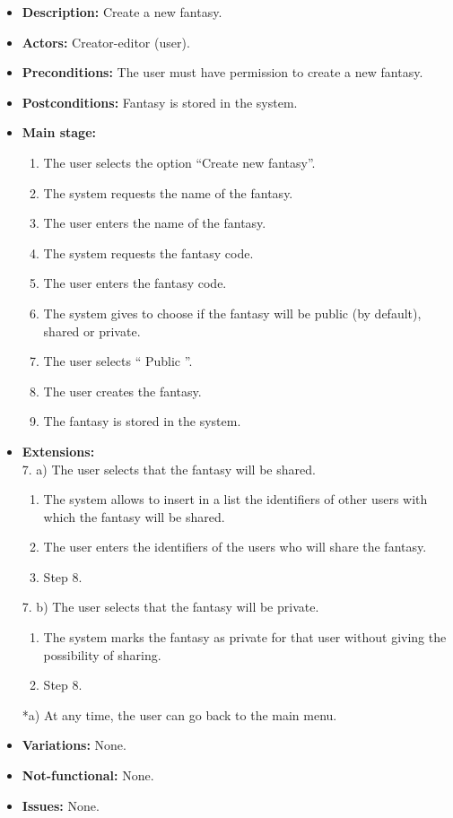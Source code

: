 \begin{itemize}
	\item \textbf{Description:} Create a new fantasy.
	\item \textbf{Actors:} Creator-editor (user).
	\item \textbf{Preconditions:} The user must have permission to create a new fantasy.
	\item \textbf{Postconditions:} Fantasy is stored in the system.
	\item \textbf{Main stage:}
	\begin{enumerate}
		\item The user selects the option ``Create new fantasy''.
		\item The system requests the name of the fantasy.
		\item The user enters the name of the fantasy.
		\item The system requests the fantasy code.
		\item The user enters the fantasy code.
		\item The system gives to choose if the fantasy will be public (by default), shared or private.
		\item The user selects `` Public ''.
		\item The user creates the fantasy.
		\item The fantasy is stored in the system.
	\end{enumerate}
	\item \textbf{Extensions:} \\7. a) The user selects that the fantasy will be shared.
	\begin{enumerate}
		\item The system allows to insert in a list the identifiers of other users with which the fantasy will be shared.
		\item The user enters the identifiers of the users who will share the fantasy.
		\item Step 8.
	\end{enumerate}
	7. b) The user selects that the fantasy will be private.
	\begin{enumerate}
		\item The system marks the fantasy as private for that user without giving the possibility of sharing.
		\item Step 8.
	\end{enumerate}
	*a) At any time, the user can go back to the main menu.
	\item \textbf{Variations:} None.
	\item \textbf{Not-functional:} None.
	\item \textbf{Issues:} None.
\end{itemize}


